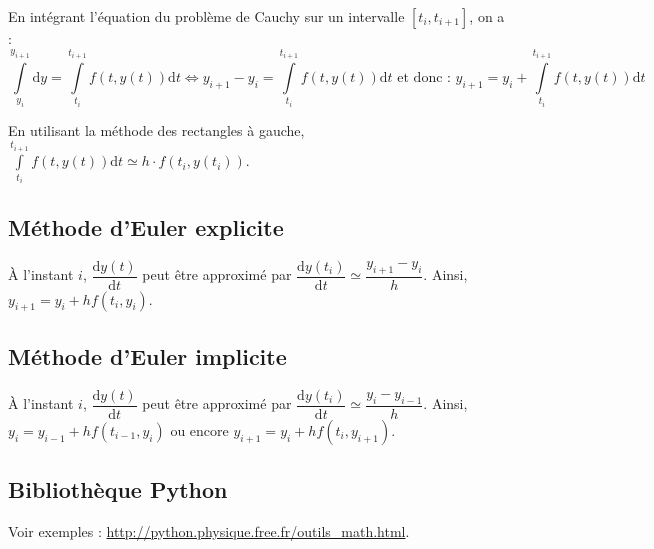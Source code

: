 \begin{resultat}
En intégrant l'équation du problème de Cauchy sur un intervalle $[t_i, t_{i+1}]$, on a : 
$$
\int\limits_{y_i}^{y_{i+1}} \text{d}y = \int\limits_{t_i}^{t_{i+1}} f(t,y(t)) \text{d}t 
\Longleftrightarrow 
y_{i+1} - y_i = \int\limits_{t_i}^{t_{i+1}} f(t,y(t)) \text{d}t  \text{ et donc : }  y_{i+1}= y_i + \int\limits_{t_i}^{t_{i+1}} f(t,y(t)) \text{d}t 
$$

 En utilisant la méthode des rectangles à gauche, $\int\limits_{t_i}^{t_{i+1}} f(t,y(t)) \text{d}t  \simeq h \cdot f(t_i,y(t_i)) $.

\end{resultat}


\subsection{Méthode d'Euler explicite}

À l'instant $i$, $\dfrac{\text{d}y(t)}{\text{d}t}$ peut être approximé par 
$\dfrac{\text{d}y(t_i)}{\text{d}t} \simeq \dfrac{y_{i+1}-y_i}{h}$.
Ainsi, $y_{i+1} = y_i +h  f(t_i,y_i)$.

\subsection*{Méthode d'Euler implicite}
À l'instant $i$, $\dfrac{\text{d}y(t)}{\text{d}t}$ peut être approximé par 
$\dfrac{\text{d}y(t_{i})}{\text{d}t} \simeq \dfrac{y_{i}-y_{i-1}}{h}$.
Ainsi, $y_{i} = y_{i-1} +h  f(t_{i-1},y_{i})$ ou encore $y_{i+1} = y_{i} +h  f(t_{i},y_{i+1})$.
\subsection*{Bibliothèque Python}

Voir exemples : \url{http://python.physique.free.fr/outils_math.html}.


